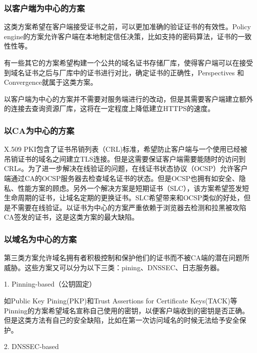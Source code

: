 \subsubsection{以客户端为中心的方案}

这类方案希望在客户端接受证书之前，可以更加准确的验证证书的有效性。Policy engine\cite{abadi2013global}的方案允许客户端在本地制定信任决策，比如支持的密码算法，证书的一致性性等。

有一些其它的方案希望构建一个公共的域名证书存储厂库，使得客户端可以在接受到域名证书之后与厂库中的证书进行对比，确定证书的正确性，Perspectives\cite{wendlandt2008perspectives} 和 Convergence\cite{convergence}就属于这类方案。

以客户端为中心的方案并不需要对服务端进行的改动，但是其需要客户端建立额外的连接去查询资源厂库，这将在一定程度上降低建立HTTPS的速度。


\subsubsection{以CA为中心的方案}

X.509 PKI包含了证书吊销列表（CRL)标准\cite{cooper2008internet}，希望防止客户端与一个使用已经被吊销证书的域名之间建立TLS连接。但是这需要保证客户端需要能随时的访问到CRLs。为了进一步解决在线验证的问题，在线证书状态协议（OCSP）\cite{myers1999x}允许客户端通过CA的OCSP服务器去检查域名证书的状态。但是OCSP也拥有如安全、隐私、性能方案的顾虑。另外一个解决方案是短期证书（SLC）\cite{topalovic2012towards}，该方案希望签发短生命周期的证书，让域名定期的更换证书。SLC希望带来和OCSP类似的好处，但是不需要在线验证。以证书为中心的方案严重依赖于浏览器去检测和拉黑被攻陷CA签发的证书，这是这类方案的最大缺陷。


\subsubsection{以域名为中心的方案}


第三类方案允许域名拥有者积极控制和保护他们的证书而不被CA端的潜在问题所威胁。这些方案又可以分为以下三类：pining、DNSSEC、日志服务器。

1. Pinning-based（公钥固定）

如Public Key Pining(PKP)\cite{evans2015public}和Trust Assertions for Certificate Keys(TACK)\cite{topalovic2012towards}等Pinning的方案希望域名宣称自己使用的密钥，以便客户端收到的密钥是否正确。但是这类方法有自己的安全缺陷，比如在第一次访问域名的时候无法给予安全保护。

2. DNSSEC-based

